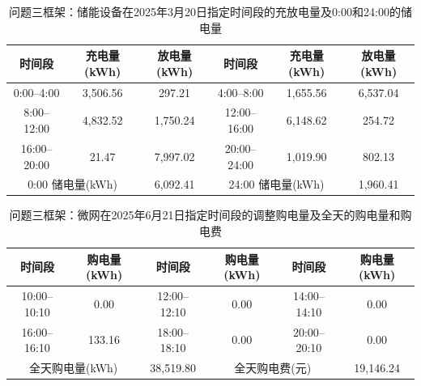 \begin{table}[H]
  \centering
  \caption{问题三框架：储能设备在2025年3月20日指定时间段的充放电量及0:00和24:00的储电量}
  \label{tab:q4-3-storage-0320}
  \small
  \renewcommand{\arraystretch}{1.3}
  \begin{tabular}{|c|c|c|c|c|c|}
    \hline
    时间段 & 充电量(kWh) & 放电量(kWh) & 时间段 & 充电量(kWh) & 放电量(kWh) \\
    \hline
    0:00--4:00 & 3{,}506.56 & 297.21 & 4:00--8:00 & 1{,}655.56 & 6{,}537.04 \\
    \hline
    8:00--12:00 & 4{,}832.52 & 1{,}750.24 & 12:00--16:00 & 6{,}148.62 & 254.72 \\
    \hline
    16:00--20:00 & 21.47 & 7{,}997.02 & 20:00--24:00 & 1{,}019.90 & 802.13 \\
    \hline
    \multicolumn{2}{|c|}{0:00 储电量(kWh)} & \multicolumn{1}{c|}{6{,}092.41} & \multicolumn{2}{c|}{24:00 储电量(kWh)} & \multicolumn{1}{c|}{1{,}960.41} \\
    \hline
  \end{tabular}
\end{table}

\begin{table}[H]
  \centering
  \caption{问题三框架：微网在2025年6月21日指定时间段的调整购电量及全天的购电量和购电费}
  \label{tab:q4-3-adj-0621}
  \small
  \renewcommand{\arraystretch}{1.3}
  \begin{tabular}{|c|c|c|c|c|c|}
    \hline
    时间段 & 购电量(kWh) & 时间段 & 购电量(kWh) & 时间段 & 购电量(kWh) \\
    \hline
    10:00--10:10 & 0.00 & 12:00--12:10 & 0.00 & 14:00--14:10 & 0.00 \\
    \hline
    16:00--16:10 & 133.16 & 18:00--18:10 & 0.00 & 20:00--20:10 & 0.00 \\
    \hline
    \multicolumn{2}{|c|}{全天购电量(kWh)} & \multicolumn{1}{c|}{38{,}519.80} & \multicolumn{2}{c|}{全天购电费(元)} & \multicolumn{1}{c|}{19{,}146.24} \\
    \hline
  \end{tabular}
\end{table}

